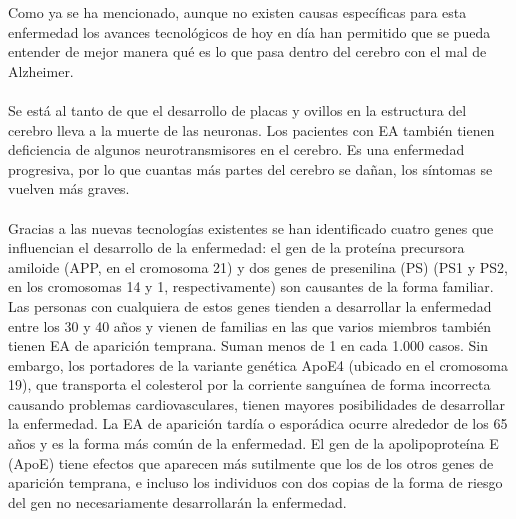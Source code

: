 \documentclass[smallextended, 12pt]{article}
\begin{document}
	Como ya se ha mencionado, aunque no existen causas espec\'ificas para esta enfermedad los avances tecnol\'ogicos de hoy en d\'ia han permitido que se pueda entender de mejor manera qu\'e es lo que pasa dentro del cerebro con el mal de Alzheimer. \cite{ref4}\\
	\\
	Se est\'a al tanto de que el desarrollo de placas y ovillos en la estructura del cerebro lleva a la muerte de las neuronas. Los pacientes con EA tambi\'en tienen deficiencia de algunos neurotransmisores en el cerebro. Es una enfermedad progresiva, por lo que cuantas m\'as partes del cerebro se da\~nan, los s\'intomas se vuelven m\'as graves. \cite{ref5}\\
	\\
	Gracias a las nuevas tecnolog\'ias existentes se han identificado cuatro genes que influencian el desarrollo de la enfermedad: el gen de la prote\'ina precursora amiloide (APP, en el cromosoma 21) y dos genes de presenilina (PS) (PS1 y PS2, en los cromosomas 14 y 1, respectivamente) son causantes de la forma familiar. Las personas con cualquiera de estos genes tienden a desarrollar la enfermedad entre los 30 y 40 a\~nos y vienen de familias en las que varios miembros tambi\'en tienen EA de aparici\'on temprana. Suman menos de 1 en cada 1.000 casos. Sin embargo, los portadores de la variante gen\'etica ApoE4 (ubicado en el cromosoma 19), que transporta el colesterol por la corriente sangu\'inea de forma incorrecta causando problemas cardiovasculares, tienen mayores posibilidades de desarrollar la enfermedad. La EA de aparici\'on tard\'ia o espor\'adica ocurre alrededor de los 65 a\~nos y es la forma m\'as com\'un de la enfermedad. El gen de la apolipoprote\'ina E (ApoE) tiene efectos que aparecen m\'as sutilmente que los de los otros genes de aparici\'on temprana, e incluso los individuos con dos copias de la forma de riesgo del gen no necesariamente desarrollar\'an la enfermedad. \cite{ref6} \cite{ref5}
	
\end{document}
